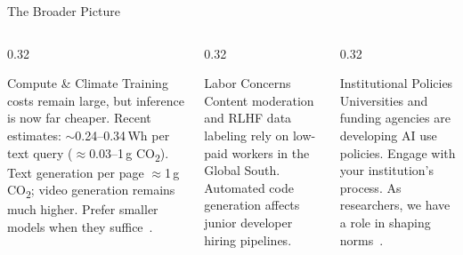 \begin{frame}{The Broader Picture}
  \begin{columns}[T, onlytextwidth]
    \begin{column}{0.32\textwidth}
      \begin{block}{Compute \& Climate}
        Training costs remain large, but inference is now far cheaper. Recent estimates: $\sim$0.24--0.34\,Wh per text query ($\approx$0.03--1\,g CO\textsubscript{2}). Text generation per page $\approx$1\,g CO\textsubscript{2}; video generation remains much higher. Prefer smaller models when they suffice~\parencite{bender2021stochastic}.
      \end{block}
    \end{column}
    \hfill
    \begin{column}{0.32\textwidth}
      \begin{block}{Labor Concerns}
        Content moderation and RLHF data labeling rely on low-paid workers in the Global South. Automated code generation affects junior developer hiring pipelines.
      \end{block}
    \end{column}
    \hfill
    \begin{column}{0.32\textwidth}
      \begin{block}{Institutional Policies}
        Universities and funding agencies are developing AI use policies. Engage with your institution's process. As researchers, we have a role in shaping norms~\parencite{bommasani2021foundation}.
      \end{block}
    \end{column}
  \end{columns}
\end{frame}
